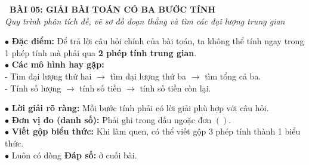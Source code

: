 \documentclass[14pt,a4paper,oneside]{extbook}
\begin{document}
\noindent
\begin{tcolorbox}[
  enhanced,
  colback=teal!8!white,
  colframe=teal!80!black,
  arc=3mm, boxrule=1pt,
  left=3mm, right=3mm, top=2mm, bottom=2mm,
  halign=center
]
  {\Large\bfseries\color{teal!90!black}\faBookmark\ BÀI 05: GIẢI BÀI TOÁN CÓ BA BƯỚC TÍNH}\\[1.5pt]
  {\footnotesize\itshape\color{black!75} Quy trình phân tích đề, vẽ sơ đồ đoạn thẳng và tìm các đại lượng trung gian}
\end{tcolorbox}

\vspace{2.5mm}

\noindent
\begin{minipage}[t]{0.49\textwidth}
  \begin{tcolorbox}[
    enhanced,
    title={\footnotesize\bfseries\color{white}\faSearch\ 1. Bản chất bài toán 3 bước},
    colback=blue!2!white,
    colframe=blue!75!black,
    arc=2.5mm, boxrule=0.8pt, top=1.8mm, bottom=1.8mm, left=2mm, right=2mm
  ]
    \footnotesize
    $\bullet$ \textbf{Đặc điểm:} Để trả lời câu hỏi chính của bài toán, ta không thể tính ngay trong 1 phép tính mà phải qua \textbf{2 phép tính trung gian}.\\
    $\bullet$ \textbf{Các mô hình hay gặp:}\\
    - Tìm đại lượng thứ hai $\rightarrow$ tìm đại lượng thứ ba $\rightarrow$ tìm tổng cả ba.\\
    - Tính số lượng $\rightarrow$ tính số tiền $\rightarrow$ tính số tiền còn lại.
  \end{tcolorbox}
\end{minipage}%
\hfill
\begin{minipage}[t]{0.49\textwidth}
  \begin{tcolorbox}[
    enhanced,
    title={\footnotesize\bfseries\color{white}\faCheckSquareO\ 2. Kĩ năng giải chuẩn mực},
    colback=teal!2!white,
    colframe=teal!75!black,
    arc=2.5mm, boxrule=0.8pt, top=1.8mm, bottom=1.8mm, left=2mm, right=2mm
  ]
    \footnotesize
    $\bullet$ \textbf{Lời giải rõ ràng:} Mỗi bước tính phải có lời giải phù hợp với câu hỏi.\\
    $\bullet$ \textbf{Đơn vị đo (danh số):} Phải ghi trong dấu ngoặc đơn $( )$.\\
    $\bullet$ \textbf{Viết gộp biểu thức:} Khi làm quen, có thể viết gộp 3 phép tính thành 1 biểu thức.\\
    $\bullet$ Luôn có dòng \textbf{Đáp số:} ở cuối bài.
  \end{tcolorbox}
\end{minipage}
\end{document}
